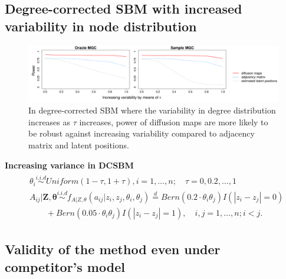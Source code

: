 \documentclass[12pt]{article}
\begin{document}
\subsection*{Degree-corrected SBM with increased variability in node distribution}	

\begin{figure}[H]
	\centering
	\includegraphics[width=6in]{../Figure/powerplot_var.pdf}
	\caption{In degree-corrected SBM where the variability in degree distribution increases as $\tau$ increases, power of diffusion maps are more likely to be robust against increasing variability compared to adjacency matrix and latent positions.}
	\label{fig:dcSBM}
\end{figure}	

\textbf{Increasing variance in DCSBM}
\begin{equation}
\label{eq:dcVariance}
\begin{gathered}
\begin{aligned}
& \theta_{i} \overset{i.i.d}{\sim} Uniform(1 - \tau, 1 + \tau), i = 1, \ldots, n; \quad \tau = 0, 0.2, \ldots, 1\\ 
& A_{ij} | \mathbf{Z}, \mathbf{\theta}   \overset{i.i.d}{\sim}   f_{A|Z, \theta}(a_{ij} | z_{i}, z_{j}, \theta_{i}, \theta_{j}) \stackrel{d}{=} Bern(0.2 \cdot \theta_{i}\theta_{j}) I ( |z_{i} - z_{j}| = 0 ) \\ & \quad \quad + Bern(0.05 \cdot \theta_{i} \theta_{j} ) I(|z_{i} - z_{j}| = 1), \quad i,j=1, \ldots, n; i < j. 
\end{aligned}
\end{gathered}
\end{equation}

\subsection*{Validity of the method even under competitor's model}
\end{document}
